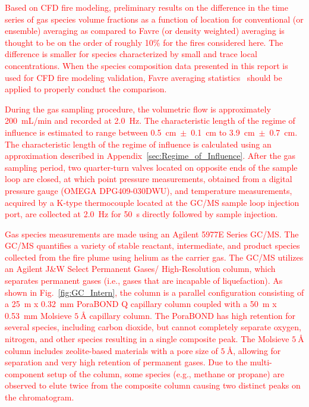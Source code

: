 \documentclass[12pt]{article}
\begin{document}
\textcolor{red}{Based on CFD fire modeling, preliminary results on the difference in the time series of gas species volume fractions as a function of location for conventional (or ensemble) averaging as compared to Favre (or density weighted) averaging is thought to be on the order of roughly 10\% for the fires considered here. The difference is smaller for species characterized by small and trace local concentrations. When the species composition data presented in this report is used for CFD fire modeling validation, Favre averaging statistics~\cite{bilger1975note} should be applied to properly conduct the comparison.}

\textcolor{red}{During the gas sampling procedure, the volumetric flow is approximately 200~mL/min and recorded at \SI{2.0}{\hertz}. The characteristic length of the regime of influence is estimated to range between 0.5~cm~$\pm$~0.1~cm to 3.9~cm~$\pm$~0.7~cm. The characteristic length of the regime of influence is calculated using an approximation described in Appendix~\ref{sec:Regime_of_Influence}. After the gas sampling period, two quarter-turn valves located on opposite ends of the sample loop are closed, at which point pressure measurements, obtained from a digital pressure gauge (OMEGA DPG409-030DWU), and temperature measurements, acquired by a K-type thermocouple located at the GC/MS sample loop injection port, are collected at \SI{2.0}{\hertz} for \SI{50}{s} directly followed by sample injection.}

\textcolor{red}{Gas species measurements are made using an Agilent 5977E Series GC/MS. The GC/MS quantifies a variety of stable reactant, intermediate, and product species collected from the fire plume using helium as the carrier gas. The GC/MS utilizes an Agilent J\&W Select Permanent Gases/ High-Resolution column, which separates permanent gases (i.e., gases that are incapable of liquefaction). As shown in Fig.~\ref{fig:GC_Intern}, the column is a parallel configuration consisting of a 25~m x 0.32~mm PoraBOND Q capillary column coupled with a 50~m x 0.53~mm Molsieve $\SI{5}{\angstrom}$ capillary column. The PoraBOND has high retention for several species, including carbon dioxide, but cannot completely separate oxygen, nitrogen, and other species resulting in a single composite peak. The Molsieve $\SI{5}{\angstrom}$ column includes zeolite-based materials with a pore size of $\SI{5}{\angstrom}$, allowing for separation and very high retention of permanent gases. Due to the multi-component setup of the column, some species (e.g., methane or propane) are observed to elute twice from the composite column causing two distinct peaks on the chromatogram.}
\end{document}

